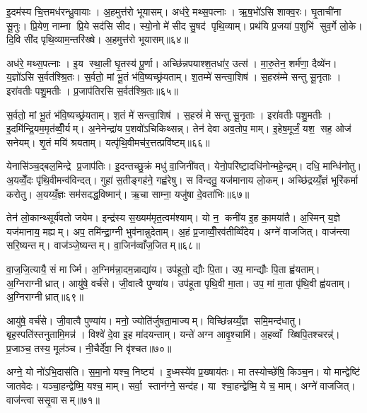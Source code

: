 इ॒दम॑स्य चि॒त्तमध॑रन्ध्रु॒वायाः। अ॒हमुत्त॑रो भूयासम्। अध॑रे॒ मथ्स॒पत्नाः। ऋ॒ष॒भो॑ऽसि शाक्व॒रः। घृ॒ताची॑ना सू॒नुः। प्रि॒येण॒ नाम्ना प्रि॒ये सद॑सि सीद। स्यो॒नो मे॑ सीद सु॒षद॑ पृथि॒व्याम्। प्रथ॑यि प्र॒जया॑ प॒शुभि॑ सुव॒र्गे लो॒के। दि॒वि सी॑द पृथि॒व्याम॒न्तरि॑ख्षे। अ॒हमुत्त॑रो भूयासम्॥६४॥

अध॑रे॒ मथ्स॒पत्नाः। इ॒य स्था॒ली घृ॒तस्य॑ पू॒र्णा। अच्छि॑न्नपयाश्श॒तधा॑र॒ उत्स॑। मा॒रु॒तेन॒ शर्म॑णा॒ दैव्ये॑न। य॒ज्ञो॑ऽसि स॒र्वत॑श्श्रि॒तः। स॒र्वतो॒ मां भू॒तं भ॑वि॒ष्यच्छ्र॑यताम्। श॒तम्मे॑ सन्त्वा॒शिष॑। स॒हस्र॑म्मे सन्तु सू॒नृताः। इरा॑वतीः पशु॒मतीः। प्र॒जाप॑तिरसि स॒र्वत॑श्श्रि॒तः॥६५॥

स॒र्वतो॒ मां भू॒तं भ॑वि॒ष्यच्छ्र॑यताम्। श॒तं मे॑ सन्त्वा॒शिष॑। स॒हस्रं॑ मे सन्तु सू॒नृताः। इरा॑वतीः पशु॒मतीः। इ॒दमि॑न्द्रि॒यम॒मृत॑व्वीँ॒र्यम्। अ॒नेनेन्द्रा॑य प॒शवो॑ऽचिकिथ्सन्न्। तेन॑ देवा अव॒तोप॒ माम्। इ॒हेष॒मूर्जं॒ यश॒ सह॒ ओज॑ सनेयम्। शृ॒तं मयि॑ श्रयताम्। यत्पृ॑थि॒वीमच॑र॒त्तत्प्रवि॑ष्टम्॥६६॥

येनासि॑ञ्च॒द्बल॒मिन्द्रे प्र॒जाप॑तिः। इ॒दन्तच्छु॒क्रं मधु॑ वा॒जिनी॑वत्। येनो॒परि॑ष्टा॒दधि॑नोन्महे॒न्द्रम्। दधि॒ मान्धि॑नोतु। अ॒यव्वेँ॒दः पृ॑थि॒वीमन्व॑विन्दत्। गुहा॑ स॒तीङ्गह॑ने॒ गह्व॑रेषु। स वि॑न्दतु॒ यज॑मानाय लो॒कम्। अच्छि॑द्रय्यँ॒ज्ञं भूरि॑कर्मा करोतु। अ॒यय्यँ॒ज्ञः सम॑सदद्ध॒विष्मान्॑। ऋ॒चा साम्ना॒ यजु॑षा दे॒वता॑भिः॥६७॥

तेन॑ लो॒कान्थ्सूर्य॑वतो जयेम। इन्द्र॑स्य स॒ख्यम॑मृत॒त्वम॑श्याम्। यो न॒ कनी॑य इ॒ह का॒मया॑तै। अ॒स्मिन् य॒ज्ञे यज॑मानाय॒ मह्यम्। अप॒ तमि॑न्द्रा॒ग्नी भुव॑नान्नुदेताम्। अ॒हं प्र॒जाव्वीँ॒रव॑तीव्विँदेय। अग्ने॑ वाजजित्। वाज॑न्त्वा सरि॒ष्यन्तम्। वाज॑ञ्जे॒ष्यन्तम्। वा॒जिन॑व्वाँज॒जितम्॥६८॥

वा॒ज॒जि॒त्यायै॒ सं मार्ज्मि। अ॒ग्निम॑न्ना॒दम॒न्नाद्या॑य। उप॑हूतो॒ द्यौः पि॒ता। उप॒ मान्द्यौः पि॒ता ह्व॑यताम्। अ॒ग्निराग्नीध्रात्। आयु॑षे॒ वर्च॑से। जी॒वात्वै पुण्या॑य। उप॑हूता पृथि॒वी मा॒ता। उप॒ मां मा॒ता पृ॑थि॒वी ह्व॑यताम्। अ॒ग्निराग्नीध्रात्॥६९॥

आयु॑षे॒ वर्च॑से। जी॒वात्वै पुण्या॑य। मनो॒ ज्योति॑र्जुषता॒माज्यम्। विच्छि॑न्नय्यँ॒ज्ञ समि॒मन्द॑धातु। बृह॒स्पति॑स्तनुतामि॒मन्न॑। विश्वे॑ दे॒वा इ॒ह मा॑दयन्ताम्। यन्ते॑ अग्न आवृ॒श्चामि॑। अ॒हव्वाँ ख्षिपि॒तश्चरन्न्॑। प्र॒जाञ्च॒ तस्य॒ मूल॑ञ्च। नी॒चैर्दे॑वा॒ नि वृ॑श्चत॥७०॥

अग्ने॒ यो नो॑ऽभि॒दास॑ति। स॒मा॒नो यश्च॒ निष्ट्य॑। इ॒ध्मस्ये॑व प्र॒ख्षाय॑तः। मा तस्योच्छे॑षि॒ किञ्च॒न। यो मान्द्वेष्टि॑ जातवेदः। यञ्चा॒हन्द्वेष्मि॒ यश्च॒ माम्। सर्वा॒ स्तान॑ग्ने॒ सन्द॑ह। या श्चा॒हन्द्वेष्मि॒ ये च॒ माम्। अग्ने॑ वाजजित्। वाज॑न्त्वा ससृ॒वासम्॥७१॥

